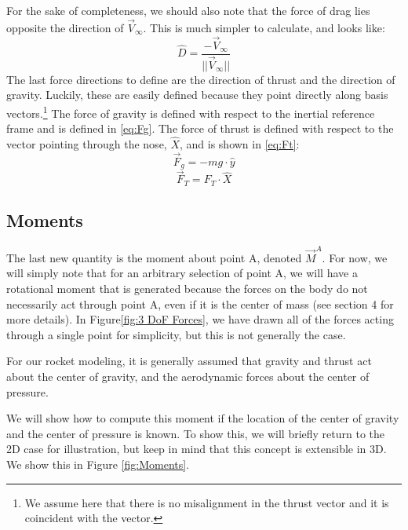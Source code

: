 \documentclass[12pt]{report}
\begin{document}
For the sake of completeness, we should also note that the force of drag lies opposite the direction of $\vec{V}_{\infty}$. This is much simpler to calculate, and looks like:
\begin{equation}\label{eq:drag}
\hat{D}=\frac{-\vec{V}_{\infty}}{||\vec{V}_{\infty}||}
\end{equation}
The last force directions to define are the direction of thrust and the direction of gravity. Luckily, these are easily defined because they point directly along basis vectors.\footnote{We assume here that there is no misalignment in the thrust vector and it is coincident with the  vector.} The force of gravity is defined with respect to the inertial reference frame and is defined in \eqref{eq:Fg}. The force of thrust is defined with respect to the vector pointing through the nose, $\hat{X}$, and is shown in \eqref{eq:Ft}:
\begin{equation}\label{eq:Fg}
    \vec{F}_g=-mg\cdot \hat{y}
\end{equation}
\begin{equation}\label{eq:Ft}
    \vec{F}_T=F_T\cdot \hat{X}
\end{equation}
\subsection{Moments}\label{sec:moments}
The last new quantity is the moment about point A, denoted $\vec{M}^A$. For now, we will simply note that for an arbitrary selection of point A, we will have a rotational moment that is generated because the forces on the body do not necessarily act through point A, even if it is the center of mass (see section 4 for more details). In Figure\ref{fig:3 DoF Forces}, we have drawn all of the forces acting through a single point for simplicity, but this is not generally the case.

For our rocket modeling, it is generally assumed that gravity and thrust act about the center of gravity, and the aerodynamic forces about the center of pressure.

We will show how to compute this moment if the location of the center of gravity and the center of pressure is known. To show this, we will briefly return to the 2D case for illustration, but keep in mind that this concept is extensible in 3D. We show this in Figure \ref{fig:Moments}.
\end{document}
